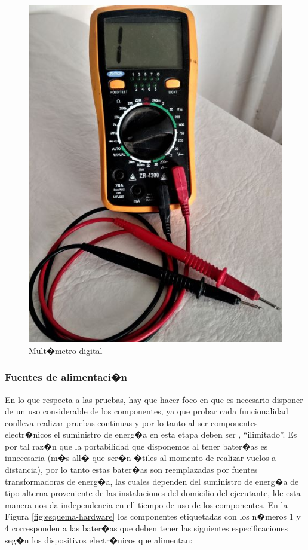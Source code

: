 \begin{figure}
	\centering
	\includegraphics[width=0.6\linewidth, height=0.3\textheight]{Imagenes/testerModoCont}
	\caption{Mult�metro digital}
	\label{fig:testermodocont}
\end{figure}



\subsubsection{Fuentes de alimentaci�n}

En lo que respecta a las pruebas, hay que hacer foco en que es necesario disponer de un uso considerable de los componentes, ya que probar cada funcionalidad conlleva realizar pruebas continuas y por lo tanto al ser componentes electr�nicos el suministro de energ�a en esta etapa deben ser , ``ilimitado''. Es por tal raz�n que la portabilidad que disponemos al tener bater�as es innecesaria (m�s all� que ser�n �tiles al momento de realizar vuelos a distancia),  por lo tanto estas bater�as son reemplazadas por fuentes transformadoras de energ�a, las cuales dependen del suministro de energ�a de tipo alterna proveniente de las instalaciones del domicilio del ejecutante, lde esta manera nos da independencia en ell tiempo de uso de los componentes. En la Figura \ref{fig:esquema-hardware} los componentes etiquetadas con los n�meros 1 y 4 corresponden a las bater�as que deben tener las siguientes especificaciones seg�n los dispositivos electr�nicos que alimentan:

